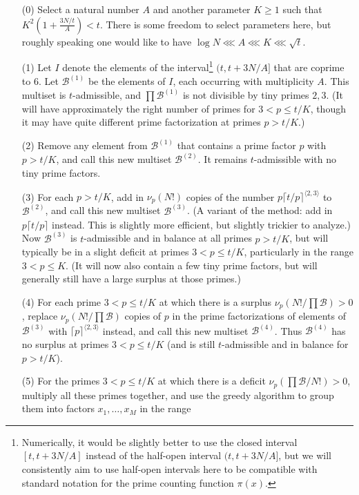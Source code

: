 \documentclass[12pt,a4paper,reqno]{amsart}
\numberwithin{equation}{section}
\theoremstyle{plain}
\theoremstyle{definition}
\newcommand\tuple{{\mathcal B}}
\begin{document}
\begin{enumerate}
\item[(0)] Select a natural number $A$ and another parameter $K \geq 1$ such that $K^2 (1+\frac{3N/t}{A}) < t$.  There is some freedom to select parameters here, but roughly speaking one would like to have $\log N \lll A \lll K \lll \sqrt{t}$.
\item[(1)] Let $I$ denote the elements of the interval\footnote{Numerically, it would be slightly better to use the closed interval $[t,t+ 3N/A]$ instead of the half-open interval $(t,t+3N/A]$, but we will consistently aim to use half-open intervals here to be compatible with standard notation for the prime counting function $\pi(x)$.} $(t,t+3N/A]$ that are coprime to $6$.  Let $\tuple^{(1)}$ be the elements of $I$, each occurring with multiplicity $A$.  This multiset is $t$-admissible, and $\prod \tuple^{(1)}$ is not divisible by tiny primes $2,3$.  (It will have approximately the right number of primes for $3 < p \leq t/K$, though it may have quite different prime factorization at primes $p>t/K$.)
\item[(2)] Remove any element from $\tuple^{(1)}$ that contains a prime factor $p$ with $p > t/K$, and call this new multiset $\tuple^{(2)}$.  It remains $t$-admissible with no tiny prime factors.
\item[(3)] For each $p > t/K$, add in $\nu_p(N!)$ copies of the number $p \lceil t/p \rceil^{\langle 2,3\rangle}$ to $\tuple^{(2)}$, and call this new multiset $\tuple^{(3)}$.  (A variant of the method: add in $p \lceil t/p \rceil$ instead. This is slightly more efficient, but slightly trickier to analyze.)  Now $\tuple^{(3)}$ is $t$-admissible and in balance at all primes $p>t/K$, but will typically be in a slight deficit at primes $3 < p \leq t/K$, particularly in the range $3 < p \leq K$.  (It will now also contain a few tiny prime factors, but will generally still have a large surplus at those primes.)
\item[(4)] For each prime $3 < p \leq t/K$ at which there is a surplus $\nu_p(N!/\prod \tuple) > 0$, replace $\nu_p(N!/\prod \tuple)$ copies of $p$ in the prime factorizations of elements of $\tuple^{(3)}$ with $\lceil p \rceil^{\langle 2,3 \rangle}$ instead, and call this new multiset $\tuple^{(4)}$.  Thus $\tuple^{(4)}$ has no surplus at primes $3 < p \leq t/K$ (and is still $t$-admissible and in balance for $p>t/K$).
\item [(5)]For the primes $3 < p \leq t/K$ at which there is a deficit $\nu_p(\prod \tuple/N!) > 0$, multiply all these primes together, and use the greedy algorithm to group them into factors $x_1, \dots, x_M$ in the range

\end{enumerate}
\end{document}
